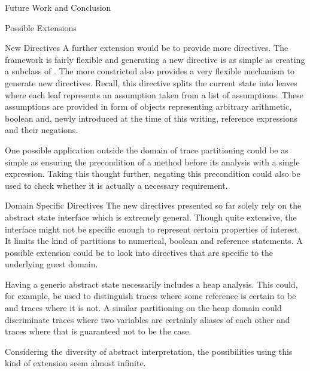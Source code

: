 \begin{chapter}{Future Work and Conclusion}
\begin{section}{Possible Extensions}

		\begin{subsection}{New Directives}
			A further extension would be to provide more directives. The framework is fairly flexible and generating a new directive is as simple as creating a subclass of . The more constricted  also provides a very flexible mechanism to generate new directives. Recall, this directive splits the current state into leaves where each leaf represents an assumption taken from a list of assumptions. These assumptions are provided in form of  objects representing arbitrary arithmetic, boolean and, newly introduced at the time of this writing, reference expressions and their negations.

			One possible application outside the domain of trace partitioning could be as simple as ensuring the precondition of a method before its analysis with a single expression. Taking this thought further, negating this precondition could also be used to check whether it is actually a necessary requirement.
		\end{subsection}


		\begin{subsection}{Domain Specific Directives}
			The new directives presented so far solely rely on the abstract state interface which is extremely general. Though quite extensive, the  interface might not be specific enough to represent certain properties of interest. It limits the kind of partitions to numerical, boolean and reference statements. A possible extension could be to look into directives that are specific to the underlying guest domain. 
			
			Having a generic abstract state necessarily includes a heap analysis. This could, for example, be used to distinguish traces where some reference is certain to be  and traces where it is not. A similar partitioning on the heap domain could discriminate traces where two variables are certainly aliases of each other and traces where that is guaranteed not to be the case.

			Considering the diversity of abstract interpretation, the possibilities using this kind of extension seem almost infinite.
		\end{subsection}
	\end{section}



\end{chapter}
